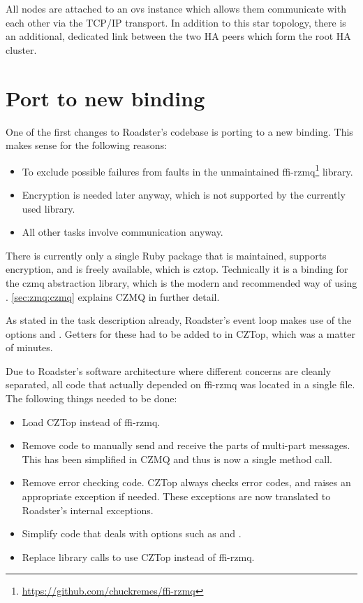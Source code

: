 All nodes are attached to an \gls{ovs} instance which allows them communicate with each
other via the TCP/IP transport. In addition to this star topology, there is an
additional, dedicated link between the two HA peers which form the root HA
cluster.


\section{Port to new \zmq binding}\label{sec:approach:port}
One of the first changes to Roadster's codebase is porting to a new \zmq
binding. This makes sense for the following reasons:

\begin{itemize}
\item To exclude possible failures from faults in the unmaintained ffi-rzmq\footnote{\url{https://github.com/chuckremes/ffi-rzmq}} library.
\item Encryption is needed later anyway, which is not supported by the currently used library.
\item All other tasks involve \zmq communication anyway.
\end{itemize}

There is currently only a single Ruby package that is maintained, supports
encryption, and is freely available, which is \gls{cztop}. Technically it is a
binding for the \gls{czmq} abstraction library, which is the modern and recommended way of
using \zmq. \autoref{sec:zmq:czmq} explains CZMQ in further detail.

As stated in the task description already, Roadster's event loop makes use of
the \zmq options  and . Getters for these had to be
added to in CZTop, which was a matter of minutes.

Due to Roadster's software architecture where different concerns
are cleanly separated, all code that actually depended
on ffi-rzmq was located in a single file. The following
things needed to be done:

\begin{itemize}
\item Load CZTop instead of ffi-rzmq.
\item Remove code to manually send and receive the parts of multi-part messages. This has been simplified
in CZMQ and thus is now a single method call.
\item Remove error checking code. CZTop always checks error codes, and raises
an appropriate exception if needed. These exceptions are now translated to Roadster's internal exceptions.
\item Simplify code that deals with \zmq options such as  and .
\item Replace library calls to use CZTop instead of ffi-rzmq.
\end{itemize}

